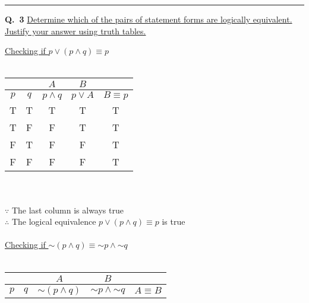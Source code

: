 \documentclass[a4paper,12pt]{article}
\newcommand*{\ltnot}{\mathord{\sim}}
\begin{document}
\begin{center}
    \rule{6cm}{0.4pt}
\end{center}
\newpage
\noindent \textbf{Q.~3} \ul{Determine which of the pairs of statement forms are logically equivalent. Justify your answer using truth tables.}\\
\begin{center}
    \ul{Checking if $p \lor (p \land q) \equiv p$}\\\ \\
    {
    \begin{tabular}{|c c| c | c | c|}
        \multicolumn{2}{c}{} & \multicolumn{1}{c}{$A$} & \multicolumn{1}{c}{$B$} & \multicolumn{1}{c}{}                \\
        \hline
        $p$                  & $q$                     & $p \land q$             & $p \lor A$           & $B \equiv p$ \\
        \hline
        T                    & T                       & T                       & T                    & T            \\
        T                    & F                       & F                       & T                    & T            \\
        F                    & T                       & F                       & F                    & T            \\
        F                    & F                       & F                       & F                    & T            \\
        \hline
    \end{tabular}}
    \ \\\ \\
    $\because$ The last column is always true\\
    $\therefore$ The logical equivalence $p \lor (p \land q) \equiv p$ is true\\\ \\
    \ul{Checking if $\ltnot (p \land q) \equiv \ltnot p \land \ltnot q$}\\\ \\
    {
    \begin{tabular}{|c c| c | c | c|}
        \multicolumn{2}{c}{} & \multicolumn{1}{c}{$A$} & \multicolumn{1}{c}{$B$} & \multicolumn{1}{c}{}                     \\
        \hline
        $p$                  & $q$                     & $\ltnot (p \land q)$    & $\ltnot p \land \ltnot q$ & $A \equiv B$ \\

\end{tabular}}
\end{center}
\end{document}
